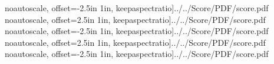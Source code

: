 \documentclass[12pt]{article}
\begin{document}
 noautoscale, offset=-2.5in 1in, keepaspectratio]{../../Score/PDF/score.pdf}
 noautoscale, offset=2.5in 1in, keepaspectratio]{../../Score/PDF/score.pdf}
 noautoscale, offset=-2.5in 1in, keepaspectratio]{../../Score/PDF/score.pdf}
 noautoscale, offset=2.5in 1in, keepaspectratio]{../../Score/PDF/score.pdf}
 noautoscale, offset=-2.5in 1in, keepaspectratio]{../../Score/PDF/score.pdf}
\end{document}
